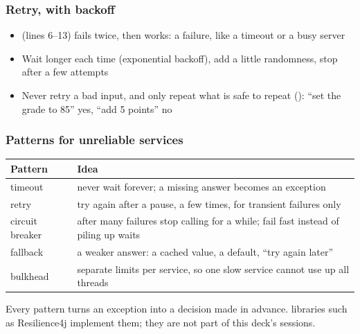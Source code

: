 \documentclass[aspectratio=169,10pt,compress]{beamer}
\begin{document}
\begin{frame}[t,fragile] \frametitle{Retry, with backoff}

	\begin{itemize}\footnotesize
		\item<2->  (lines 6--13) fails twice, then works: a  failure, like a timeout or a busy server
		\item<2-> Wait longer each time (exponential backoff), add a little randomness, stop after a few attempts
		\item<2-> Never retry a bad input, and only repeat what is safe to repeat (): ``set the grade to 85'' yes,
			  ``add 5 points'' no
	\end{itemize}
\end{frame}




\begin{frame}[t,fragile] \frametitle{Patterns for unreliable services}


\begin{table}
		\footnotesize
		\begin{tabular}{@{}L{0.22\textwidth}L{0.70\textwidth}@{}}
			\toprule
			\textbf{Pattern} & \textbf{Idea} \\
			\midrule
			timeout & never wait forever; a missing answer becomes an exception \\
			retry & try again after a pause, a few times, for transient failures only \\
			circuit breaker & after many failures stop calling for a while; fail fast instead of piling up waits \\
			fallback & a weaker answer: a cached value, a default, ``try again later'' \\
			bulkhead & separate limits per service, so one slow service cannot use up all threads \\
			\bottomrule
		\end{tabular}
\end{table}%

	\footnotesize Every pattern turns an exception into a decision made in advance.  libraries such as
	Resilience4j implement them; they are not part of this deck's sessions.
\end{frame}
\end{document}
